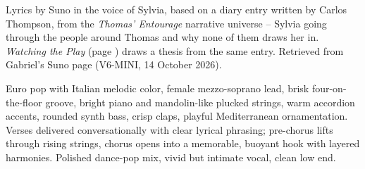 
\label{sec:different-maps}
\begin{notes}
Lyrics by Suno in the voice of Sylvia, based on a diary entry written by Carlos Thompson, from the \emph{Thomas' Entourage} narrative universe -- Sylvia going through the people around Thomas and why none of them draws her in. \emph{Watching the Play} (page \pageref{sec:watching-the-play}) draws a thesis from the same entry. Retrieved from Gabriel's Suno page (V6-MINI, 14 October 2026).
\end{notes}
\begin{style}
Euro pop with Italian melodic color, female mezzo-soprano lead, brisk four-on-the-floor groove, bright piano and mandolin-like plucked strings, warm accordion accents, rounded synth bass, crisp claps, playful Mediterranean ornamentation. Verses delivered conversationally with clear lyrical phrasing; pre-chorus lifts through rising strings, chorus opens into a memorable, buoyant hook with layered harmonies. Polished dance-pop mix, vivid but intimate vocal, clean low end.
\end{style}
